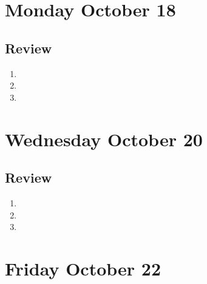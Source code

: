 

\section*{Monday October 18}

\newpage



\newpage


\newpage
\subsection*{Review}
\begin{enumerate}
\item 
\item 
\item 
\end{enumerate}


\newpage
\section*{Wednesday October 20}


\vfill


\newpage



\newpage
\subsection*{Review}
\begin{enumerate}
\item 
\item 
\item 
\end{enumerate}

\newpage
\section*{Friday October 22}




\newpage


\newpage
